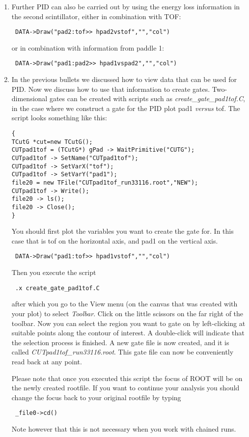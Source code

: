\documentclass[11pt]{report}
\begin{document}
\begin{enumerate}
\item Further PID can also be carried out by using the energy loss information in the second scintillator, 
either in combination with TOF:
\begin{verbatim} DATA->Draw("pad2:tof>> hpad2vstof","","col") \end{verbatim}
or in combination with information from paddle 1:
\begin{verbatim} DATA->Draw("pad1:pad2>> hpad1vspad2","","col")  \end{verbatim}


\item In the previous bullets we discussed how to view data that can be used for PID.
Now we discuss how to use that information to create gates.
Two-dimensional gates can be created with scripts such as {\it create\_gate\_pad1tof.C},
in the case where we construct a gate for the PID plot pad1 {\it versus} tof.
The script looks something like this:
\begin{verbatim}
{
TCutG *cut=new TCutG();
CUTpad1tof = (TCutG*) gPad -> WaitPrimitive("CUTG");
CUTpad1tof -> SetName("CUTpad1tof"); 
CUTpad1tof -> SetVarX("tof");
CUTpad1tof -> SetVarY("pad1");
file20 = new TFile("CUTpad1tof_run33116.root","NEW");
CUTpad1tof -> Write();
file20 -> ls();
file20 -> Close();
}
\end{verbatim}
You should first plot the variables you want to create the gate for. In this case
that is tof on the horizontal axis, and pad1 on the vertical axis. 
\begin{verbatim} DATA->Draw("pad1:tof>> hpad1vstof","","col") \end{verbatim}
Then you
execute the script
\begin{verbatim} .x create_gate_pad1tof.C  \end{verbatim}
after which you go to the View menu (on the canvas that was created with your plot) 
to select {\it Toolbar}. Click on the little scissors on the far right of the toolbar. Now
you can select the region you want to gate on by left-clicking
at suitable points along the contour of interest. A double-click will indicate that the
selection process is finished. A new gate file is now created, and it is called 
{\it CUTpad1tof\_run33116.root}. This gate file can now be conveniently read back at any point.

Please note that once you executed this script the focus of ROOT will be on the newly 
created rootfile. If you want to continue your analysis you should change the focus
back to your original rootfile by typing
\begin{verbatim} _file0->cd() \end{verbatim}
Note however that this is not necessary when you work with chained runs.


\end{enumerate}
\end{document}
